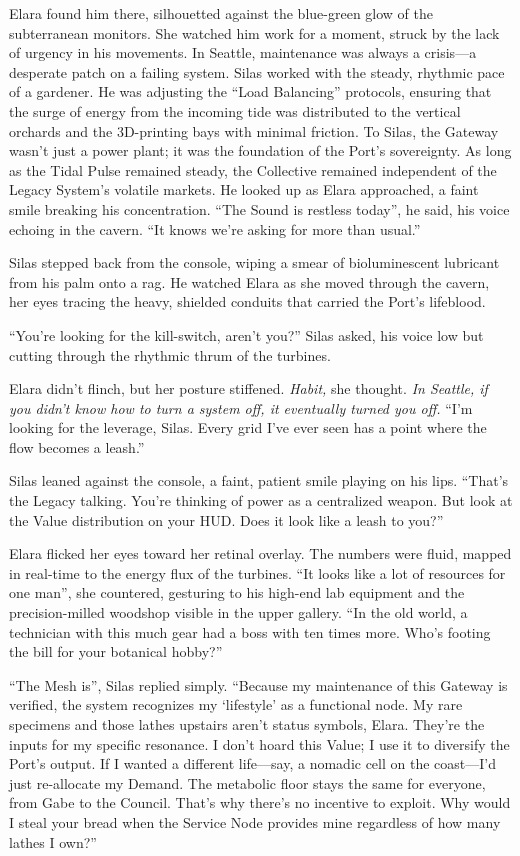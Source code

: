 Elara found him there, silhouetted against the blue-green glow of the subterranean monitors. She watched him work for a moment, struck by the lack of urgency in his movements. In Seattle, maintenance was always a crisis—a desperate patch on a failing system. Silas worked with the steady, rhythmic pace of a gardener. He was adjusting the ``Load Balancing'' protocols, ensuring that the surge of energy from the incoming tide was distributed to the vertical orchards and the 3D-printing bays with minimal friction. To Silas, the Gateway wasn't just a power plant; it was the foundation of the Port's sovereignty. As long as the Tidal Pulse remained steady, the Collective remained independent of the Legacy System's volatile markets. He looked up as Elara approached, a faint smile breaking his concentration. ``The Sound is restless today'', he said, his voice echoing in the cavern. ``It knows we're asking for more than usual.''

Silas stepped back from the console, wiping a smear of bioluminescent lubricant from his palm onto a rag. He watched Elara as she moved through the cavern, her eyes tracing the heavy, shielded conduits that carried the Port's lifeblood. 

``You're looking for the kill-switch, aren't you?'' Silas asked, his voice low but cutting through the rhythmic thrum of the turbines.

Elara didn't flinch, but her posture stiffened. \textit{Habit,} she thought. \textit{In Seattle, if you didn't know how to turn a system off, it eventually turned you off.} ``I'm looking for the leverage, Silas. Every grid I've ever seen has a point where the flow becomes a leash.''

Silas leaned against the console, a faint, patient smile playing on his lips. ``That's the Legacy talking. You're thinking of power as a centralized weapon. But look at the Value distribution on your HUD. Does it look like a leash to you?''

Elara flicked her eyes toward her retinal overlay. The numbers were fluid, mapped in real-time to the energy flux of the turbines. ``It looks like a lot of resources for one man'', she countered, gesturing to his high-end lab equipment and the precision-milled woodshop visible in the upper gallery. ``In the old world, a technician with this much gear had a boss with ten times more. Who's footing the bill for your botanical hobby?''

``The Mesh is'', Silas replied simply. ``Because my maintenance of this Gateway is verified, the system recognizes my `lifestyle' as a functional node. My rare specimens and those lathes upstairs aren't status symbols, Elara. They're the inputs for my specific resonance. I don't hoard this Value; I use it to diversify the Port's output. If I wanted a different life—say, a nomadic cell on the coast—I'd just re-allocate my Demand. The metabolic floor stays the same for everyone, from Gabe to the Council. That's why there's no incentive to exploit. Why would I steal your bread when the Service Node provides mine regardless of how many lathes I own?''

